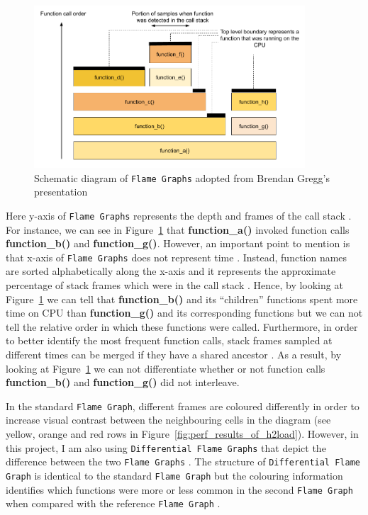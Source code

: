\documentclass[12pt,a4paper,twoside,openright]{report}
\begin{document}
    \begin{figure}[H]
    \centering
    \includegraphics[width=0.9\textwidth]{figs/Flame_Graphs_explanation.png}
    \caption{Schematic diagram of \texttt{Flame Graphs} adopted from Brendan Gregg's presentation \cite{USENIX_ATC2017_flamegraphs}}
    \label{fig:Flame_Graphs_explanation}
    \end{figure}

Here y-axis of \texttt{Flame Graphs} represents the depth and frames of the call stack \cite{CPU_Flame_graphs}.
For instance, we can see in Figure~\ref{fig:Flame_Graphs_explanation} that \textbf{function\_a()} invoked function calls \textbf{function\_b()} and \textbf{function\_g()}. 
However, an important point to mention is that x-axis of \texttt{Flame Graphs} does not represent time \cite{CPU_Flame_graphs}.
Instead, function names are sorted alphabetically along the x-axis and it represents the approximate percentage of stack frames which were in the call stack \cite{CPU_Flame_graphs}.
Hence, by looking at Figure~\ref{fig:Flame_Graphs_explanation} we can tell that \textbf{function\_b()} and its \enquote{children} functions spent more time on CPU than \textbf{function\_g()} and its corresponding functions but we can not tell the relative order in which these functions were called.
Furthermore, in order to better identify the most frequent function calls, stack frames sampled at different times can be merged if they have a shared ancestor \cite{CPU_Flame_graphs}.
As a result, by looking at Figure~\ref{fig:Flame_Graphs_explanation} we can not differentiate whether or not function calls \textbf{function\_b()} and \textbf{function\_g()} did not interleave.

In the standard \texttt{Flame Graph}, different frames are coloured differently in order to increase visual contrast between the neighbouring cells in the diagram \cite{CPU_Flame_graphs} (see yellow, orange and red rows in Figure~\ref{fig:perf_results_of_h2load}).
However, in this project, I am also using \texttt{Differential Flame Graphs} that depict the difference between the two \texttt{Flame Graphs} \cite{Differential_Flame_Graphs}.
The structure of \texttt{Differential Flame Graph} is identical to the standard \texttt{Flame Graph} but the colouring information identifies which functions were more or less common in the second \texttt{Flame Graph} when compared with the reference \texttt{Flame Graph} \cite{Differential_Flame_Graphs}.
\end{document}
